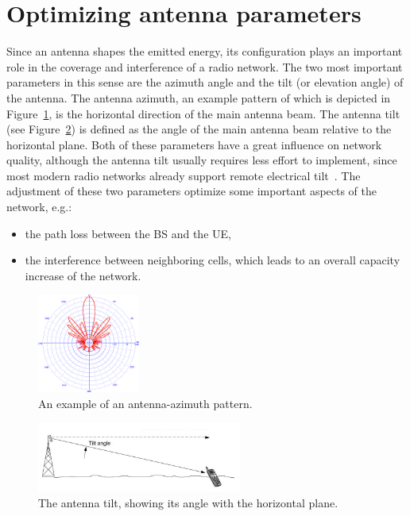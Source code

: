 \section{Optimizing antenna parameters}

Since an antenna shapes the emitted energy, its configuration plays
an important role in the coverage and interference of a radio network.
The two most important parameters in this sense are the azimuth angle
and the tilt (or elevation angle) of the antenna. The antenna azimuth,
an example pattern of which is depicted in Figure~\ref{fig:02-Antenna_azimuth},
is the horizontal direction of the main antenna beam. The antenna
tilt (see Figure~\ref{fig:02-Antenna-tilt}) is defined as the angle
of the main antenna beam relative to the horizontal plane. Both of
these parameters have a great influence on network quality, although
the antenna tilt usually requires less effort to implement, since
most modern radio networks already support remote electrical tilt~\cite{Athley-Impact_of_electrical_tilt_on_LTE_performance:2010}.
The adjustment of these two parameters optimize some important aspects
of the network, e.g.:
\begin{itemize}
\item the path loss between the BS and the UE,
\item the interference between neighboring cells, which leads to an overall
capacity increase of the network.
\end{itemize}
\begin{figure}[h]
\centering

\includegraphics[width=0.3\textwidth]{02-background_and_motivation/img/azimuth}

\caption{An example of an antenna-azimuth pattern.\label{fig:02-Antenna_azimuth}}
\end{figure}


\begin{figure}
\centering

\includegraphics[width=0.6\textwidth]{02-background_and_motivation/img/tilt}

\caption{The antenna tilt, showing its angle with the horizontal plane.\label{fig:02-Antenna-tilt}}
\end{figure}



